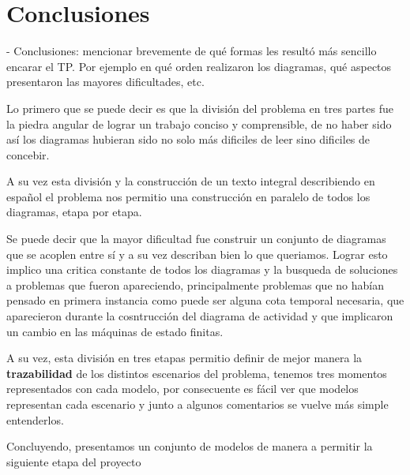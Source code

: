 \section{Conclusiones}
- Conclusiones: mencionar brevemente de qué formas les resultó más sencillo encarar el TP. Por ejemplo en qué orden realizaron los diagramas, qué aspectos presentaron las mayores dificultades, etc.

Lo primero que se puede decir es que la división del problema en tres partes fue la piedra angular de lograr un trabajo conciso y comprensible, de no haber sido así los diagramas hubieran sido no solo más dificiles de leer sino dificiles de concebir.

A su vez esta división y la construcción de un texto integral describiendo en español el problema nos permitio una construcción en paralelo de todos los diagramas, etapa por etapa. 

Se puede decir que la mayor dificultad fue construir un conjunto de diagramas que se acoplen entre sí y a su vez describan bien lo que queriamos. Lograr esto implico una critica constante de todos los diagramas y la busqueda de soluciones a problemas que fueron apareciendo, principalmente problemas que no habían pensado en primera instancia como puede ser alguna cota temporal necesaria, que aparecieron durante la cosntrucción del diagrama de actividad y que implicaron un cambio en las máquinas de estado finitas.

A su vez, esta división en tres etapas permitio definir de mejor manera la \textbf{trazabilidad} de los distintos escenarios del problema, tenemos tres momentos representados con cada modelo, por consecuente es fácil ver que modelos representan cada escenario y junto a algunos comentarios se vuelve más simple entenderlos.

Concluyendo, presentamos un conjunto de modelos de manera a permitir la siguiente etapa del proyecto	